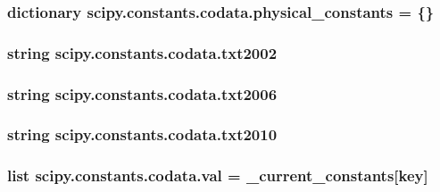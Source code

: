\subsubsection[{physical\+\_\+constants}]{\setlength{\rightskip}{0pt plus 5cm}dictionary scipy.\+constants.\+codata.\+physical\+\_\+constants = \{\}}\label{namespacescipy_1_1constants_1_1codata_ae2ae2fa33bd2c495fde6185d236e168d}
\hypertarget{namespacescipy_1_1constants_1_1codata_aacd08b2efc926217fc6c67394cf0cd2a}{}
\subsubsection[{txt2002}]{\setlength{\rightskip}{0pt plus 5cm}string scipy.\+constants.\+codata.\+txt2002}\label{namespacescipy_1_1constants_1_1codata_aacd08b2efc926217fc6c67394cf0cd2a}
\hypertarget{namespacescipy_1_1constants_1_1codata_a0090a2524defa9e3fac2ea68737049b4}{}
\subsubsection[{txt2006}]{\setlength{\rightskip}{0pt plus 5cm}string scipy.\+constants.\+codata.\+txt2006}\label{namespacescipy_1_1constants_1_1codata_a0090a2524defa9e3fac2ea68737049b4}
\hypertarget{namespacescipy_1_1constants_1_1codata_a0b1c94675bc781411bbc33082b1a579d}{}
\subsubsection[{txt2010}]{\setlength{\rightskip}{0pt plus 5cm}string scipy.\+constants.\+codata.\+txt2010}\label{namespacescipy_1_1constants_1_1codata_a0b1c94675bc781411bbc33082b1a579d}
\hypertarget{namespacescipy_1_1constants_1_1codata_a0eae1e2cc3d8419fc20b07620c03da9a}{}
\subsubsection[{val}]{\setlength{\rightskip}{0pt plus 5cm}list scipy.\+constants.\+codata.\+val = {\bf \+\_\+current\+\_\+constants}\mbox{[}key\mbox{]}}\label{namespacescipy_1_1constants_1_1codata_a0eae1e2cc3d8419fc20b07620c03da9a}
